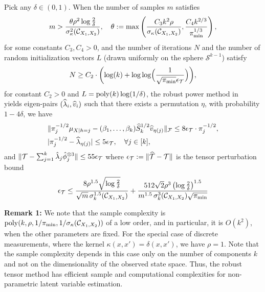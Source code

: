 \documentclass{article}
\begin{document}
\begin{theorem} \label{thm:samplebound}
Pick  any $\delta\in (0,1)$. When the number of samples $m$ satisfies
\[ m >\frac{\theta\rho^2  \log\frac{2}{\delta}}{\sigma^2_\kappa(\Ccal_{X_1, X_2})},
\quad \theta:= \max\left(\frac{C_3 k^2 \rho}{\sigma_\kappa( \Ccal_{X_1, X_2})}, \frac{C_4k^{2/3}\iffalse(1+\sigma_{k+1}(\Ccal_{X_1, X_2}))^2 \fi }{\pi_{\min}^{1/3}}\right),\] for some constants $C_3, C_4>0$, and the number of iterations $N$  and  the number of random initialization vectors $L$  (drawn uniformly on the sphere $\mathcal{S}^{k-1}$)  satisfy
\begin{align*}
  N \geq C_2 \cdot \biggl( \log(k) + \log\log\Bigl(
 \frac{1}{\sqrt{\pi_{\min}}\epsilon_{{\mathcal{T}}}} \Bigr) \biggr),
\end{align*}
for constant $C_2>0$ and  $L = \operatorname{poly}(k) \log(1/\delta)$,  the robust power method in~\cite{AnandkumarEtal:tensor12} yields eigen-pairs $(\widehat{\lambda}_i, \widehat{v}_i)$ such that there exists a permutation $\eta$, with probability $1-4\delta$, we have
\begin{align*}
&\|\pi^{-1/2}_{j} \mu_{X|h=j}-(\beta_1,\ldots,\beta_k) \widehat  S_k^{1/2}\widehat{v}_{\eta(j)}\|_{\mathcal{F}} \leq 8 \epsilon_{{\mathcal{T}}} \cdot\pi^{-1/2}_{j}
, \\
&|\pi^{-1/2}_{j}-\widehat{\lambda}_{\eta(j)}| \leq  5\epsilon_{{\mathcal{T}}}, \quad \forall j \in [k],
\end{align*}
and $\|{\mathcal{T}} - \sum\nolimits_{j=1}^k \hat\lambda_j \hat{\phi}_j^{\otimes 3} \| \leq 55\epsilon_{{\mathcal{T}}}$ where $\epsilon_{{\mathcal{T}}}:= \|\widehat{{\mathcal{T}}} - {\mathcal{T}}\|$ is the tensor perturbation bound
\begin{align*} \epsilon_{{\mathcal{T}}} \leq
\frac{8 \rho^{1.5} \sqrt{\log\frac{2}{\delta}}}{\sqrt{m} \, \sigma_k^{1.5}(\mathcal{C}_{X_1, X_2})} + \frac{512 \sqrt{2} \rho^3 \left(\log\frac{2}{\delta}\right)^{1.5}}{m^{1.5} \,\sigma_k^{3}(\mathcal{C}_{X_1, X_2}) \sqrt{\pi_{\min}}}
\end{align*}
\vspace{-3mm}
\end{theorem}

{\bf Remark 1:} We note that the sample complexity is  $\operatorname{poly}(k, \rho, 1/\pi_{\min}, 1/\sigma_\kappa(\mathcal{C}_{X_1, X_2}))$ of a low order, and in particular,  it is $O(k^2)$, when the other parameters are fixed. For the special case of discrete measurements, where the kernel $\kappa(x,x')=\delta(x,x')$, we have $\rho=1$. Note that the sample complexity depends in this case only on the number of components $k$ and not on the dimensionality of the observed state space.   Thus, the robust tensor method has efficient sample and computational complexities for non-parametric latent variable estimation.
\end{document}
